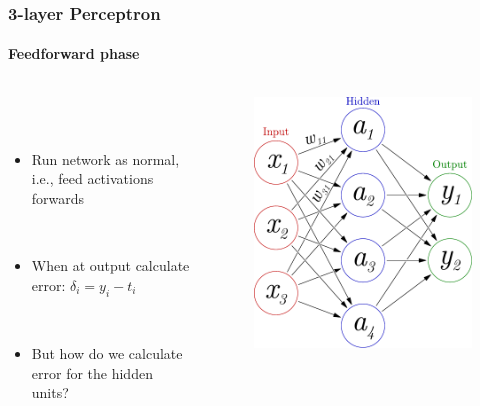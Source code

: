 \documentclass{beamer}
\newcommand{\figheight}{0.72\textheight}
\begin{document}
\begin{frame}[fragile]
\frametitle{3-layer Perceptron}
\framesubtitle{Feedforward phase}
 \begin{columns}[T]
    \begin{column}{.45\textwidth} 
             \  \\
 \   \\   
     
     
\begin{itemize}
\item Run network as normal, i.e., feed activations forwards 

\ \\

 
\item When at output calculate error: 
$\delta_i = y_i - t_i $

\ \\

 
 \item But how do we calculate error for the hidden units?
\end{itemize}
\end{column}
\begin{column}{.55\textwidth}
\begin{figure}[t]
 \begin{flushleft}

 \includegraphics[height = \figheight]{./fig/3-layer_maths.pdf}


 \end{flushleft}
\end{figure}
\end{column}

\end{columns}
\end{frame}
\end{document}
